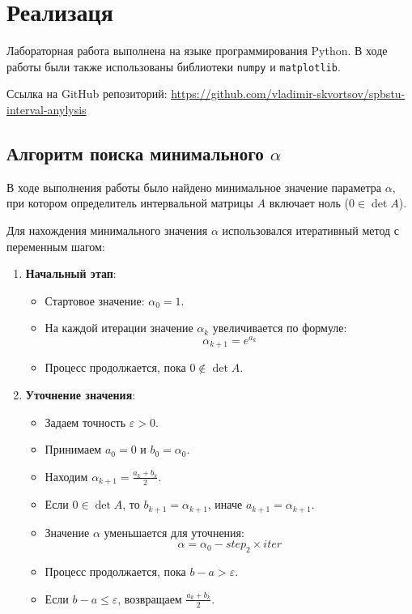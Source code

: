 \documentclass{article}
\begin{document}
  \section{Реализаця}

  Лабораторная работа выполнена на языке программирования Python. В ходе
  работы были также использованы библиотеки \verb!numpy! и
  \verb!matplotlib!.

  Ссылка на GitHub репозиторий:
  \href{https://github.com/vladimir-skvortsov/spbstu-interval-anylysis}{https://github.com/vladimir-skvortsov/spbstu-interval-anylysis}

  \subsection{Алгоритм поиска минимального \( \alpha \)}

  В ходе выполнения работы было найдено минимальное значение параметра
  \( \alpha \), при котором определитель интервальной матрицы \( A \)
  включает ноль (\( 0 \in \det A \)).

  Для нахождения минимального значения \(\alpha\) использовался
  итеративный метод с переменным шагом:

  \begin{enumerate}
    \item \textbf{Начальный этап}:
      \begin{itemize}
        \item Стартовое значение: \(\alpha_0 = 1\).
        \item На каждой итерации значение \( \alpha_k \) увеличивается по формуле:
          \[ \alpha_{k+1} = e^{a_k} \]
        \item Процесс продолжается, пока \( 0 \notin \det A \).
      \end{itemize}

    \item \textbf{Уточнение значения}:
      \begin{itemize}
        \item Задаем точность \( \varepsilon > 0 \).
        \item Принимаем \( a_0 = 0 \) и \( b_0 = \alpha_0 \).
        \item Находим \( \alpha_{k+1} = \frac{a_k + b_k}{2} \).
        \item Если \( 0 \in \det A \), то \( b_{k+1} = \alpha_{k+1} \),
          иначе \( a_{k+1} = \alpha_{k+1} \).
        \item Значение \(\alpha\) уменьшается для уточнения:
          \[ \alpha = \alpha_0 - step_2 \times iter \]
        \item Процесс продолжается, пока \( b - a > \varepsilon \).
        \item Если \( b - a \leqslant \varepsilon \), возвращаем
          \( \frac{a_k + b_k}{2} \).
      \end{itemize}
  \end{enumerate}
\end{document}
